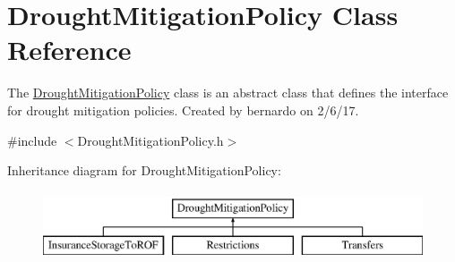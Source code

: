 \hypertarget{classDroughtMitigationPolicy}{}\section{Drought\+Mitigation\+Policy Class Reference}
\label{classDroughtMitigationPolicy}


The {\ttfamily \mbox{\hyperlink{classDroughtMitigationPolicy}{Drought\+Mitigation\+Policy}}} class is an abstract class that defines the interface for drought mitigation policies. Created by bernardo on 2/6/17.  




{\ttfamily \#include $<$Drought\+Mitigation\+Policy.\+h$>$}

Inheritance diagram for Drought\+Mitigation\+Policy\+:\begin{figure}[H]
\begin{center}
\leavevmode
\includegraphics[height=2.000000cm]{classDroughtMitigationPolicy}
\end{center}
\end{figure}
